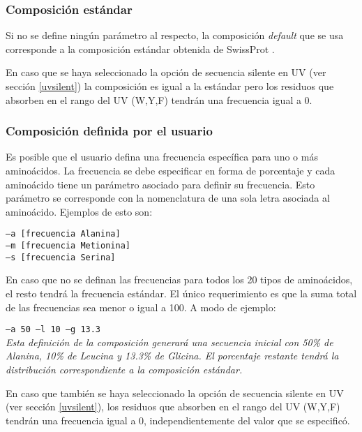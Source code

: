 \subsubsection{Composición estándar}
Si no se define ningún parámetro al respecto, la composición \textit{default} que se usa corresponde a la composición estándar obtenida de SwissProt \cite{compositionAA}.  

En caso que se haya seleccionado la opción de secuencia silente en UV (ver sección \ref{uvsilent}) la composición es igual a la estándar pero los residuos que absorben en el rango del UV (W,Y,F) tendrán una frecuencia igual a 0.

\subsubsection{Composición definida por el usuario}

Es posible que el usuario defina una frecuencia específica para uno o más aminoácidos. 
La frecuencia se debe especificar en forma de porcentaje y cada aminoácido tiene un parámetro asociado para definir su frecuencia. 
Esto parámetro se corresponde con la nomenclatura de una sola letra asociada al aminoácido. Ejemplos de esto son:

\indent \texttt{--a  [frecuencia Alanina]} \\
\indent \texttt{--m  [frecuencia Metionina]} \\
\indent \texttt{--s  [frecuencia Serina]} 

En caso que no se definan las frecuencias para todos los 20 tipos de aminoácidos, el resto tendrá la frecuencia estándar. El único requerimiento es que la suma total de las frecuencias sea menor o igual a 100.
A modo de ejemplo:

\indent \texttt{--a 50 --l 10 --g 13.3 } \\
\textit{Esta definición de la composición generará una secuencia inicial con 50\% de Alanina, 10\% de Leucina y 13.3\% de Glicina. 
El porcentaje restante tendrá la distribución correspondiente a la composición estándar.}



En caso que también se haya seleccionado la opción de secuencia silente en UV (ver sección \ref{uvsilent}), los residuos que absorben en el rango del UV (W,Y,F) tendrán una frecuencia igual a 0, independientemente del valor que se especificó.

